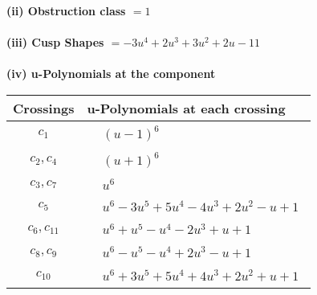 \documentclass[1p]{elsarticle_modified}
\theoremstyle{definition}
\begin{document}
\flushleft \textbf{(ii) Obstruction class $= 1$}\\~\\
\flushleft \textbf{(iii) Cusp Shapes $= -3 u^4+2 u^3+3 u^2+2 u-11$}\\~\\
\newpage\renewcommand{\arraystretch}{1}
\flushleft \textbf{(iv) u-Polynomials at the component}\newline \\
\begin{tabular}{m{50pt}|m{274pt}}
Crossings & \hspace{64pt}u-Polynomials at each crossing \\
\hline $$\begin{aligned}c_{1}\end{aligned}$$&$\begin{aligned}
&(u-1)^6
\end{aligned}$\\
\hline $$\begin{aligned}c_{2},c_{4}\end{aligned}$$&$\begin{aligned}
&(u+1)^6
\end{aligned}$\\
\hline $$\begin{aligned}c_{3},c_{7}\end{aligned}$$&$\begin{aligned}
&u^6
\end{aligned}$\\
\hline $$\begin{aligned}c_{5}\end{aligned}$$&$\begin{aligned}
&u^6-3 u^5+5 u^4-4 u^3+2 u^2- u+1
\end{aligned}$\\
\hline $$\begin{aligned}c_{6},c_{11}\end{aligned}$$&$\begin{aligned}
&u^6+u^5- u^4-2 u^3+u+1
\end{aligned}$\\
\hline $$\begin{aligned}c_{8},c_{9}\end{aligned}$$&$\begin{aligned}
&u^6- u^5- u^4+2 u^3- u+1
\end{aligned}$\\
\hline $$\begin{aligned}c_{10}\end{aligned}$$&$\begin{aligned}
&u^6+3 u^5+5 u^4+4 u^3+2 u^2+u+1
\end{aligned}$\\
\hline
\end{tabular}\\~\\
\end{document}
